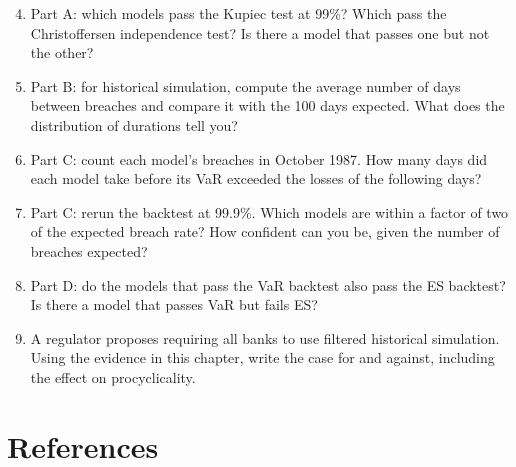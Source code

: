 \begin{enumerate}
  \setcounter{enumi}{3}
  \item Part A: which models pass the Kupiec test at 99\%? Which pass the Christoffersen independence test? Is there a model that passes one but not the other?
  \item Part B: for historical simulation, compute the average number of days between breaches and compare it with the 100 days expected. What does the distribution of durations tell you?
  \item Part C: count each model's breaches in October 1987. How many days did each model take before its VaR exceeded the losses of the following days?
  \item Part C: rerun the backtest at 99.9\%. Which models are within a factor of two of the expected breach rate? How confident can you be, given the number of breaches expected?
  \item Part D: do the models that pass the VaR backtest also pass the ES backtest? Is there a model that passes VaR but fails ES?
  \item A regulator proposes requiring all banks to use filtered historical simulation. Using the evidence in this chapter, write the case for and against, including the effect on procyclicality.
\end{enumerate}

\section*{References}

